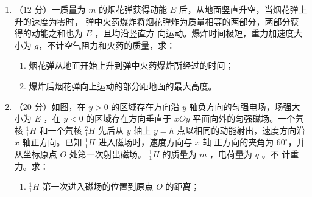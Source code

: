 \begin{enumerate}
\begin{enumerate}
\end{enumerate}



\banswer{

}



\item 
（$ 12 $ 分）一质量为 $ m $ 的烟花弹获得动能 $ E $ 后，从地面竖直升空，当烟花弹上升的速度为零时，
弹中火药爆炸将烟花弹炸为质量相等的两部分，两部分获得的动能之和也为 $ E $ ，且均沿竖直方
向运动。爆炸时间极短，重力加速度大小为 $ g $，不计空气阻力和火药的质量，求：
\begin{enumerate}
\renewcommand{\labelenumi}{\arabic{enumi}.}
\item
烟花弹从地面开始上升到弹中火药爆炸所经过的时间；



\item 
爆炸后烟花弹向上运动的部分距地面的最大高度。




\end{enumerate}


\newpage

\item 
（$ 20 $ 分）如图，在 $ y>0 $ 的区域存在方向沿 $ y $ 轴负方向的匀强电场，场强大小为 $ E $ ，在 $ y<0 $
的区域存在方向垂直于 $ xOy $ 平面向外的匀强磁场。一个氕核 $ ^{1}_{1}H $ 和一个氘核 $ ^{2}_{1}H $ 先后从 $ y $ 轴上
$ y=h $ 点以相同的动能射出，速度方向沿 $ x $ 轴正方向。已知 $ ^{1}_{1}H $ 进入磁场时，速度方向与 $ x $ 轴
正方向的夹角为 $ 60 ^{ \circ } $，并从坐标原点 $ O $ 处第一次射出磁场。 $ ^{1}_{1}H $ 的质量为 $ m $ ，电荷量为 $ q $ 。不
计重力。求：
\begin{enumerate}
\renewcommand{\labelenumi}{\arabic{enumi}.}
\item
$ ^{1}_{1}H $ 第一次进入磁场的位置到原点 $ O $ 的距离；




\end{enumerate}
\end{enumerate}
